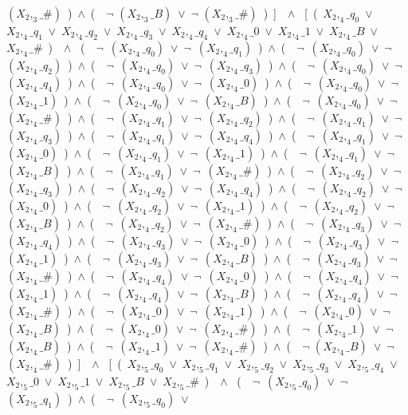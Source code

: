 ﻿\documentclass[a4paper,10pt]{article}
\begin{document}
$(X_2,_3\_\#)$\ )\ $\wedge$\ (\ \ $\neg$ $(X_2,_3\_B)$\ $\vee$\ $\neg$ $(X_2,_3\_\#)$\ )\ ]\ \ $\wedge$ \ [\ (\ $X_2,_4\_q_0$\ $\vee$\ $X_2,_4\_q_1$\ $\vee$\ $X_2,_4\_q_2$\ $\vee$\ $X_2,_4\_q_3$\ $\vee$\ $X_2,_4\_q_4$\ $\vee$\ $X_2,_4\_0$\ $\vee$\ $X_2,_4\_1$\ $\vee$\ $X_2,_4\_B$\ $\vee$\ $X_2,_4\_\#$\ )\ \ $\wedge$ \ (\ \ $\neg$\ $(X_2,_4\_q_0)$\ $\vee$\ $\neg$\ $(X_2,_4\_q_1)$\ )\ $\wedge$\ (\ \ $\neg$\ $(X_2,_4\_q_0)$\ $\vee$\ $\neg$\ $(X_2,_4\_q_2)$\ )\ $\wedge$\ (\ \ $\neg$\ $(X_2,_4\_q_0)$\ $\vee$\ $\neg$\ $(X_2,_4\_q_3)$\ )\ $\wedge$\ (\ \ $\neg$\ $(X_2,_4\_q_0)$\ $\vee$\ $\neg$\ $(X_2,_4\_q_4)$\ )\ $\wedge$\ (\ \ $\neg$\ $(X_2,_4\_q_0)$\ $\vee$\ $\neg$\ $(X_2,_4\_0)$\ )\ $\wedge$\ (\ \ $\neg$\ $(X_2,_4\_q_0)$\ $\vee$\ $\neg$\ $(X_2,_4\_1)$\ )\ $\wedge$\ (\ \ $\neg$\ $(X_2,_4\_q_0)$\ $\vee$\ $\neg$\ $(X_2,_4\_B)$\ )\ $\wedge$\ (\ \ $\neg$\ $(X_2,_4\_q_0)$\ $\vee$\ $\neg$\ $(X_2,_4\_\#)$\ )\ $\wedge$\ (\ \ $\neg$\ $(X_2,_4\_q_1)$\ $\vee$\ $\neg$\ $(X_2,_4\_q_2)$\ )\ $\wedge$\ (\ \ $\neg$\ $(X_2,_4\_q_1)$\ $\vee$\ $\neg$\ $(X_2,_4\_q_3)$\ )\ $\wedge$\ (\ \ $\neg$\ $(X_2,_4\_q_1)$\ $\vee$\ $\neg$\ $(X_2,_4\_q_4)$\ )\ $\wedge$\ (\ \ $\neg$\ $(X_2,_4\_q_1)$\ $\vee$\ $\neg$\ $(X_2,_4\_0)$\ )\ $\wedge$\ (\ \ $\neg$\ $(X_2,_4\_q_1)$\ $\vee$\ $\neg$\ $(X_2,_4\_1)$\ )\ $\wedge$\ (\ \ $\neg$\ $(X_2,_4\_q_1)$\ $\vee$\ $\neg$\ $(X_2,_4\_B)$\ )\ $\wedge$\ (\ \ $\neg$\ $(X_2,_4\_q_1)$\ $\vee$\ $\neg$\ $(X_2,_4\_\#)$\ )\ $\wedge$\ (\ \ $\neg$\ $(X_2,_4\_q_2)$\ $\vee$\ $\neg$\ $(X_2,_4\_q_3)$\ )\ $\wedge$\ (\ \ $\neg$\ $(X_2,_4\_q_2)$\ $\vee$\ $\neg$\ $(X_2,_4\_q_4)$\ )\ $\wedge$\ (\ \ $\neg$\ $(X_2,_4\_q_2)$\ $\vee$\ $\neg$\ $(X_2,_4\_0)$\ )\ $\wedge$\ (\ \ $\neg$\ $(X_2,_4\_q_2)$\ $\vee$\ $\neg$\ $(X_2,_4\_1)$\ )\ $\wedge$\ (\ \ $\neg$\ $(X_2,_4\_q_2)$\ $\vee$\ $\neg$\ $(X_2,_4\_B)$\ )\ $\wedge$\ (\ \ $\neg$\ $(X_2,_4\_q_2)$\ $\vee$\ $\neg$\ $(X_2,_4\_\#)$\ )\ $\wedge$\ (\ \ $\neg$\ $(X_2,_4\_q_3)$\ $\vee$\ $\neg$\ $(X_2,_4\_q_4)$\ )\ $\wedge$\ (\ \ $\neg$\ $(X_2,_4\_q_3)$\ $\vee$\ $\neg$\ $(X_2,_4\_0)$\ )\ $\wedge$\ (\ \ $\neg$\ $(X_2,_4\_q_3)$\ $\vee$\ $\neg$\ $(X_2,_4\_1)$\ )\ $\wedge$\ (\ \ $\neg$\ $(X_2,_4\_q_3)$\ $\vee$\ $\neg$\ $(X_2,_4\_B)$\ )\ $\wedge$\ (\ \ $\neg$\ $(X_2,_4\_q_3)$\ $\vee$\ $\neg$\ $(X_2,_4\_\#)$\ )\ $\wedge$\ (\ \ $\neg$\ $(X_2,_4\_q_4)$\ $\vee$\ $\neg$\ $(X_2,_4\_0)$\ )\ $\wedge$\ (\ \ $\neg$\ $(X_2,_4\_q_4)$\ $\vee$\ $\neg$\ $(X_2,_4\_1)$\ )\ $\wedge$\ (\ \ $\neg$\ $(X_2,_4\_q_4)$\ $\vee$\ $\neg$\ $(X_2,_4\_B)$\ )\ $\wedge$\ (\ \ $\neg$\ $(X_2,_4\_q_4)$\ $\vee$\ $\neg$\ $(X_2,_4\_\#)$\ )\ $\wedge$\ (\ \ $\neg$\ $(X_2,_4\_0)$\ $\vee$\ $\neg$\ $(X_2,_4\_1)$\ )\ $\wedge$\ (\ \ $\neg$\ $(X_2,_4\_0)$\ $\vee$\ $\neg$\ $(X_2,_4\_B)$\ )\ $\wedge$\ (\ \ $\neg$\ $(X_2,_4\_0)$\ $\vee$\ $\neg$\ $(X_2,_4\_\#)$\ )\ $\wedge$\ (\ \ $\neg$\ $(X_2,_4\_1)$\ $\vee$\ $\neg$\ $(X_2,_4\_B)$\ )\ $\wedge$\ (\ \ $\neg$\ $(X_2,_4\_1)$\ $\vee$\ $\neg$\ $(X_2,_4\_\#)$\ )\ $\wedge$\ (\ \ $\neg$ $(X_2,_4\_B)$\ $\vee$\ $\neg$ $(X_2,_4\_\#)$\ )\ ]\ \ $\wedge$ \ [\ (\ $X_2,_5\_q_0$\ $\vee$\ $X_2,_5\_q_1$\ $\vee$\ $X_2,_5\_q_2$\ $\vee$\ $X_2,_5\_q_3$\ $\vee$\ $X_2,_5\_q_4$\ $\vee$\ $X_2,_5\_0$\ $\vee$\ $X_2,_5\_1$\ $\vee$\ $X_2,_5\_B$\ $\vee$\ $X_2,_5\_\#$\ )\ \ $\wedge$ \ (\ \ $\neg$\ $(X_2,_5\_q_0)$\ $\vee$\ $\neg$\ $(X_2,_5\_q_1)$\ )\ $\wedge$\ (\ \ $\neg$\ $(X_2,_5\_q_0)$\ $\vee$\ 
\end{document}
